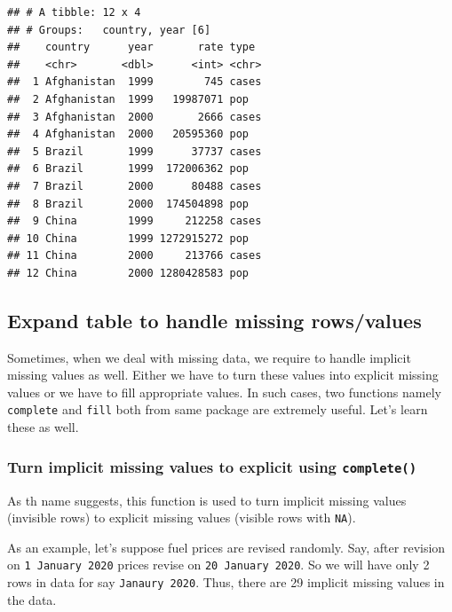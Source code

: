 \documentclass[
]{book}
\begin{document}
\begin{verbatim}
## # A tibble: 12 x 4
## # Groups:   country, year [6]
##    country      year       rate type 
##    <chr>       <dbl>      <int> <chr>
##  1 Afghanistan  1999        745 cases
##  2 Afghanistan  1999   19987071 pop  
##  3 Afghanistan  2000       2666 cases
##  4 Afghanistan  2000   20595360 pop  
##  5 Brazil       1999      37737 cases
##  6 Brazil       1999  172006362 pop  
##  7 Brazil       2000      80488 cases
##  8 Brazil       2000  174504898 pop  
##  9 China        1999     212258 cases
## 10 China        1999 1272915272 pop  
## 11 China        2000     213766 cases
## 12 China        2000 1280428583 pop
\end{verbatim}

\hypertarget{expand-table-to-handle-missing-rowsvalues}{%
\subsection{Expand table to handle missing rows/values}\label{expand-table-to-handle-missing-rowsvalues}}

Sometimes, when we deal with missing data, we require to handle implicit missing values as well. Either we have to turn these values into explicit missing values or we have to fill appropriate values. In such cases, two functions namely \texttt{complete} and \texttt{fill} both from same package are extremely useful. Let's learn these as well.

\hypertarget{turn-implicit-missing-values-to-explicit-using-complete}{%
\subsubsection*{\texorpdfstring{Turn implicit missing values to explicit using \texttt{complete()}}{Turn implicit missing values to explicit using complete()}}\label{turn-implicit-missing-values-to-explicit-using-complete}}

As th name suggests, this function is used to turn implicit missing values (invisible rows) to explicit missing values (visible rows with \texttt{NA}).

As an example, let's suppose fuel prices are revised randomly. Say, after revision on \texttt{1\ January\ 2020} prices revise on \texttt{20\ January\ 2020}. So we will have only 2 rows in data for say \texttt{Janaury\ 2020}. Thus, there are 29 implicit missing values in the data.
\end{document}
